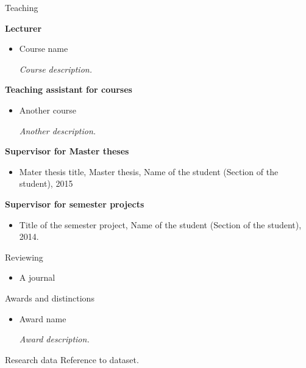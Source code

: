 \documentclass[twoside, a4paper, 11pt]{cv}
\newcommand{\activite}[1]{\textbf{#1}\ }
\begin{document}
\begin{rubrique}{Teaching}

\noindent\activite{Lecturer}

\begin{itemize}
\item Course name

\emph{Course description.}

\end{itemize}

\noindent\activite{Teaching assistant for courses}
\begin{itemize}
\item Another course

\emph{Another description.}

\end{itemize}

\noindent\activite{Supervisor for Master theses}
\begin{itemize}
\item Mater thesis title, Master thesis, Name of the student (Section of the student), 2015
\end{itemize}

\noindent\activite{Supervisor for semester projects}
\begin{itemize}
\item Title of the semester project, Name of the student (Section of the student), 2014.
\end{itemize}
\end{rubrique}

\begin{rubrique}{Reviewing}
\begin{itemize}
\item A journal
\end{itemize}
\end{rubrique}

\begin{rubrique}{Awards and distinctions}
\begin{itemize}
\item Award name

\emph{Award description.}
\end{itemize}
\end{rubrique}

\begin{rubrique}{Research data}
Reference to dataset.
\end{rubrique}
\end{document}
